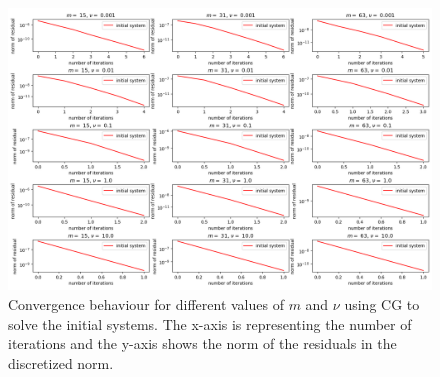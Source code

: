 \documentclass{amsart}
\theoremstyle{definition}
\theoremstyle{remark}
\numberwithin{equation}{section}
\begin{document}
\begin{figure}[h!]
\centering
\includegraphics[scale=0.52]{./imgs/CG_analysis_initial}
\caption{Convergence behaviour for different values of $m$ and $\nu$ using CG to solve the initial systems.
The x-axis is representing the number of iterations and the y-axis shows the norm of the residuals in the discretized norm.}
\label{fig:CG-convergence-initial}
\end{figure}

\end{document}
